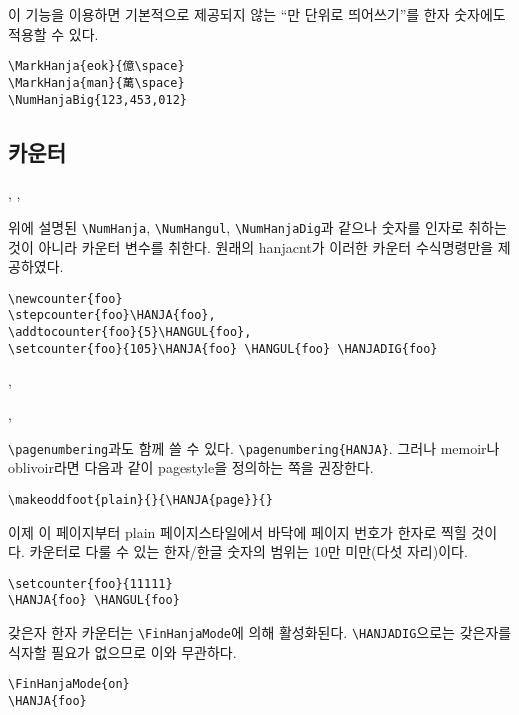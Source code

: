 \documentclass[b5paper,nanum]{oblivoir}
\def\cs#1{\texttt{\textbackslash #1}}
\def\pkg#1{\textsf{#1}}
\begin{document}
이 기능을 이용하면 기본적으로 제공되지 않는 ``만 단위로 띄어쓰기''를 한자 숫자에도 적용할 수 있다.
\begin{verbatim}
\MarkHanja{eok}{億\space}
\MarkHanja{man}{萬\space}
\NumHanjaBig{123,453,012}
\end{verbatim}


\subsection{카운터}
\begin{boxedverbatim}
, , 
\end{boxedverbatim}
위에 설명된 \cs{NumHanja}, \cs{NumHangul}, \cs{NumHanjaDig}과 같으나 숫자를 인자로 취하는 것이 아니라
카운터 변수를 취한다. 원래의 \pkg{hanjacnt}가 이러한 카운터 수식명령만을 제공하였다.

\begin{verbatim}
\newcounter{foo}
\stepcounter{foo}\HANJA{foo},
\addtocounter{foo}{5}\HANGUL{foo},
\setcounter{foo}{105}\HANJA{foo} \HANGUL{foo} \HANJADIG{foo}
\end{verbatim}
,
\addtocounter{foo}{5},
\setcounter{foo}{105}  

\medskip

\cs{pagenumbering}과도 함께 쓸 수 있다. \verb|\pagenumbering{HANJA}|.
그러나 \pkg{memoir}나 \pkg{oblivoir}라면 다음과 같이 pagestyle을 정의하는 쪽을 권장한다.
\begin{verbatim}
\makeoddfoot{plain}{}{\HANJA{page}}{}
\end{verbatim}
이제 이 페이지부터 plain 페이지스타일에서 바닥에 페이지 번호가 한자로 찍힐 것이다.
카운터로 다룰 수 있는 한자/한글 숫자의 범위는 10만 미만(다섯 자리)이다.
\begin{verbatim}
\setcounter{foo}{11111}
\HANJA{foo} \HANGUL{foo}
\end{verbatim}
\setcounter{foo}{11111}
 

\bigskip

갖은자 한자 카운터는 \cs{FinHanjaMode}에 의해 활성화된다. \cs{HANJADIG}으로는 갖은자를 식자할
필요가 없으므로 이와 무관하다.
\begin{verbatim}
\FinHanjaMode{on}
\HANJA{foo}
\end{verbatim}
\end{document}
